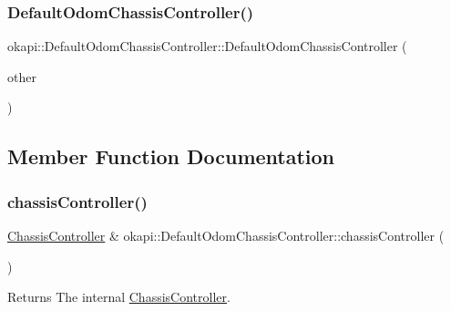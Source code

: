 \subsubsection{\texorpdfstring{DefaultOdomChassisController()}{DefaultOdomChassisController()}\hspace{0.1cm}{\footnotesize\ttfamily [3/3]}}
{\footnotesize\ttfamily okapi\+::\+Default\+Odom\+Chassis\+Controller\+::\+Default\+Odom\+Chassis\+Controller (\begin{DoxyParamCaption}\item[{\mbox{\hyperlink{classokapi_1_1DefaultOdomChassisController}{Default\+Odom\+Chassis\+Controller}} \&\&}]{other }\end{DoxyParamCaption})\hspace{0.3cm}{\ttfamily [delete]}}



\subsection{Member Function Documentation}
\mbox{\label{classokapi_1_1DefaultOdomChassisController_add1bed5d02d3da37306ef0016b7ad8a2}} 
\subsubsection{\texorpdfstring{chassisController()}{chassisController()}}
{\footnotesize\ttfamily \mbox{\hyperlink{classokapi_1_1ChassisController}{Chassis\+Controller}} \& okapi\+::\+Default\+Odom\+Chassis\+Controller\+::chassis\+Controller (\begin{DoxyParamCaption}{ }\end{DoxyParamCaption})}

\begin{DoxyReturn}{Returns}
The internal \mbox{\hyperlink{classokapi_1_1ChassisController}{Chassis\+Controller}}. 
\end{DoxyReturn}
\mbox{\label{classokapi_1_1DefaultOdomChassisController_ad89098abcab5e9f333cb3c70c9e8299f}} 
